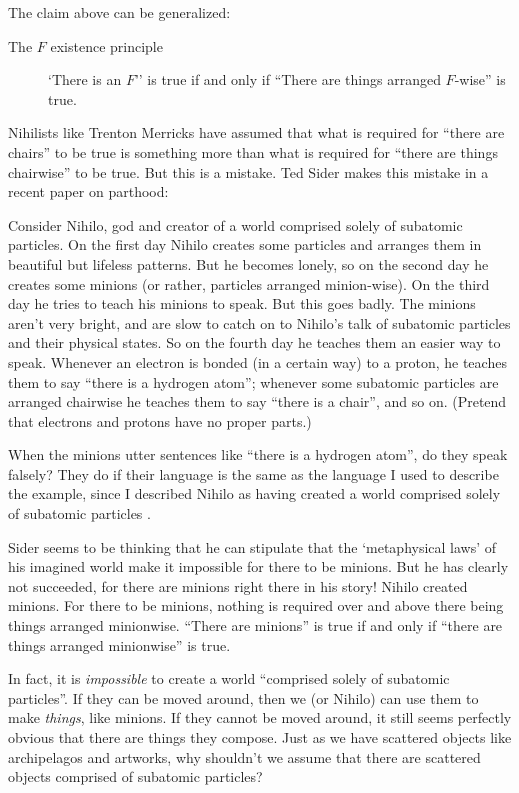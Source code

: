 \documentclass[11pt]{article}
\newenvironment{squote}{%
\begin{spacing}{1}
       	\begin{list}{}{%
\setlength{\labelwidth}{0pt}%
\rightmargin\leftmargin%
}
\item\relax
}{%
\end{list}%
\end{spacing}
}
\begin{document}
\begin{spacing}{1.25}
The claim above can be generalized:

\begin{description}
  \item[The $F$ existence principle] `There is an $F$'' is true if
    and only if ``There are things arranged $F$-wise'' is
    true. \label{fwise}
\end{description}

Nihilists like Trenton Merricks have assumed that what is required for
``there are chairs'' to be true is something more than what is
required for ``there are things chairwise'' to be true.  But this is a
mistake.  Ted Sider makes this mistake in a recent paper on parthood:

\begin{squote}
Consider Nihilo, god and creator of a world comprised solely of
subatomic particles.  On the first day Nihilo creates some particles
and arranges them in beautiful but lifeless patterns.  But he becomes
lonely, so on the second day he creates some minions (or rather,
particles arranged minion-wise).  On the third day he tries to teach
his minions to speak.  But this goes badly.  The minions aren't very
bright, and are slow to catch on to Nihilo's talk of subatomic
particles and their physical states.  So on the fourth day he teaches
them an easier way to speak.  Whenever an electron is bonded (in a
certain way) to a proton, he teaches them to say ``there is a hydrogen
atom''; whenever some subatomic particles are arranged chairwise he
teaches them to say ``there is a chair'', and so on.  (Pretend that
electrons and protons have no proper parts.)

When the minions utter sentences like ``there is a hydrogen atom'', do
they speak falsely?  They do if their language is the same as the
language I used to describe the example, since I described Nihilo as
having created a world comprised solely of subatomic particles
\citeyearpar[7]{sider2011c}.
\end{squote}

Sider seems to be thinking that he can stipulate that the
`metaphysical laws' of his imagined world make it impossible for there
to be minions.  But he has clearly not succeeded, for there are
minions right there in his story!  Nihilo created minions.  For there
to be minions, nothing is required over and above there being things
arranged minionwise.  ``There are minions'' is true if and only if
``there are things arranged minionwise'' is true.

In fact, it is {\em impossible} to create a world ``comprised solely
of subatomic particles''.  If they can be moved around, then we (or
Nihilo) can use them to make {\em things}, like minions.  If they
cannot be moved around, it still seems perfectly obvious that there
are things they compose.  Just as we have scattered objects like
archipelagos and artworks, why shouldn't we assume that there are
scattered objects comprised of subatomic particles?


\end{spacing}
\end{document}
